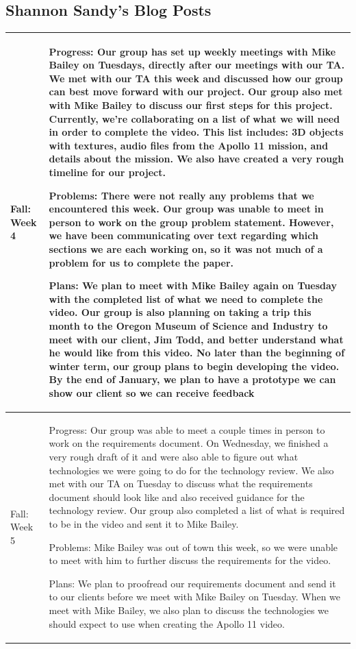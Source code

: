 \documentclass[onecolumn, draftclsnofoot,10pt, compsoc]{IEEEtran}
\begin{document}
\subsection* {Shannon Sandy's Blog Posts}
\begin{longtable} {|p{1.5cm}|p{13.5cm}|} \hline
Fall: Week 4 & 
Progress: Our group has set up weekly meetings with Mike Bailey on Tuesdays, directly after our meetings with our TA. We met with our TA this week and discussed how our group can best move forward with our project. Our group also met with Mike Bailey to discuss our first steps for this project. Currently, we're collaborating on a list of what we will need in order to complete the video. This list includes: 3D objects with textures, audio files from the Apollo 11 mission, and details about the mission. We also have created a very rough timeline for our project.

Problems: There were not really any problems that we encountered this week. Our group was unable to meet in person to work on the group problem statement. However, we have been communicating over text regarding which sections we are each working on, so it was not much of a problem for us to complete the paper.

Plans: We plan to meet with Mike Bailey again on Tuesday with the completed list of what we need to complete the video. Our group is also planning on taking a trip this month to the Oregon Museum of Science and Industry to meet with our client, Jim Todd, and better understand what he would like from this video. No later than the beginning of winter term, our group plans to begin developing the video. By the end of January, we plan to have a prototype we can show our client so we can receive feedback\\ \hline

Fall: Week 5 & 
Progress: Our group was able to meet a couple times in person to work on the requirements document. On Wednesday, we finished a very rough draft of it and were also able to figure out what technologies we were going to do for the technology review. We also met with our TA on Tuesday to discuss what the requirements document should look like and also received guidance for the technology review. Our group also completed a list of what is required to be in the video and sent it to Mike Bailey.

Problems: Mike Bailey was out of town this week, so we were unable to meet with him to further discuss the requirements for the video.

Plans: We plan to proofread our requirements document and send it to our clients before we meet with Mike Bailey on Tuesday. When we meet with Mike Bailey, we also plan to discuss the technologies we should expect to use when creating the Apollo 11 video. \\ \hline


\end{longtable}
\end{document}
